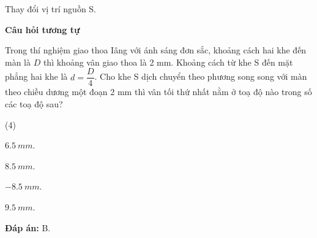 \begin{dang}{Thay đổi vị trí nguồn S.}
{ \begin{center}
	\textbf{Câu hỏi tương tự}
\end{center}

Trong thí nghiệm giao thoa Iâng với ánh sáng đơn sắc, khoảng cách hai khe đến màn là $D$ thì khoảng vân giao thoa là 2 mm. Khoảng cách từ khe S đến mặt phẳng hai khe là $d = \dfrac{D}{4}$. Cho khe S dịch chuyển theo phương song song với màn theo chiều dương một đoạn 2 mm thì vân tối thứ nhất nằm ở toạ độ nào trong số các toạ độ sau?
\begin{mcq}(4)
\item $ \SI{+6,5}{mm} $.
\item $ \SI{+8,5}{mm} $.			
\item $ \SI{-8,5}{mm} $.			
\item $ \SI{+9,5}{mm} $.
\end{mcq}

\textbf{Đáp án:} B.
}

\end{dang}

